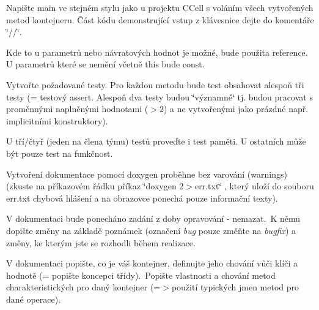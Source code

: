 \begin{DoxyEnumerate}
\item Napište main ve stejném stylu jako u projektu C\+Cell s voláním všech vytvořených metod kontejneru. Část kódu demonstrující vstup z klávesnice dejte do komentáře \char`\"{}//\char`\"{}.~\newline
~\newline

\item Kde to u parametrů nebo návratových hodnot je možné, bude použita reference. U parametrů které se nemění včetně {\ttfamily this} bude {\ttfamily const}.~\newline
~\newline

\item Vytvořte požadované testy. Pro každou metodu bude test obsahovat alespoň tři testy (= testový {\ttfamily assert}. Alespoň dva testy budou \char`\"{}významné\char`\"{} tj. budou pracovat s proměnnými naplněnými hodnotami ($>$2) a ne vytvořenými jako prázdné např. implicitními konstruktory).~\newline
~\newline

\item U tří/čtyř (jeden na člena týmu) testů proveďte i test paměti. U ostatních může být pouze test na funkčnost.~\newline
~\newline

\item Vytvoření dokumentace pomocí doxygen proběhne bez varování (warnings) (zkuste na příkazovém řádku příkaz {\ttfamily \char`\"{}doxygen 2$>$err.\+txt\char`\"{}} , který uloží do souboru err.\+txt chybová hlášení a na obrazovce ponechá pouze informační texty).~\newline
~\newline

\item V dokumentaci bude ponecháno zadání z doby opravování -\/ nemazat.~K němu dopište změny na základě poznámek (označení {\itshape bug} pouze změňte na {\itshape bugfix}) a změny, ke kterým jste se rozhodli během realizace.~\newline
~\newline

\item V dokumentaci popište, co je váš kontejner, definujte jeho chování vůči klíči a hodnotě (= popište koncepci třídy).~Popište vlastnosti a chování metod charakteristických pro daný kontejner (=$>$použití typických jmen metod pro dané operace).~\newline
~\newline


\end{DoxyEnumerate}

